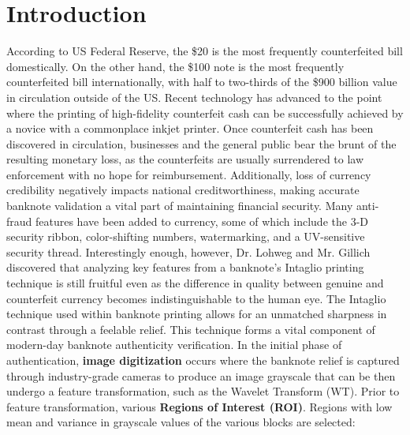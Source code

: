 \documentclass{article}
\begin{document}
\section{Introduction}
According to US Federal Reserve, the \$20 is the most frequently counterfeited bill domestically. On the other hand, the \$100 note is the most frequently counterfeited bill internationally, with half to two-thirds of the \$900 billion value in circulation outside of the US\cite{intro_cite}. Recent technology has advanced to the point where the printing of high-fidelity counterfeit cash can be successfully achieved by a novice with a commonplace inkjet printer. Once counterfeit cash has been discovered in circulation, businesses and the general public bear the brunt of the resulting monetary loss, as the counterfeits are usually surrendered to law enforcement with no hope for reimbursement. Additionally, loss of currency credibility negatively impacts national creditworthiness, making accurate banknote validation a vital part of maintaining financial security.
\newline\newline
Many anti-fraud features have been added to currency, some of which include the 3-D security ribbon, color-shifting numbers, watermarking, and a UV-sensitive security thread. Interestingly enough, however, Dr. Lohweg and Mr. Gillich discovered that analyzing key features from a banknote's Intaglio printing technique is still fruitful even as the difference in quality between genuine and counterfeit currency becomes indistinguishable to the human eye.
\newline\newline
The Intaglio technique used within banknote printing allows for an unmatched sharpness in contrast through a feelable relief\cite{intaglio}. This technique forms a vital component of modern-day banknote authenticity verification. In the initial phase of authentication, \textbf{image digitization} occurs where the banknote relief is captured through industry-grade cameras to produce an image grayscale that can be then undergo a feature transformation, such as the Wavelet Transform (WT). Prior to feature transformation, various \textbf{Regions of Interest (ROI)}. Regions with low mean and variance in grayscale values of the various blocks are selected:
\end{document}
